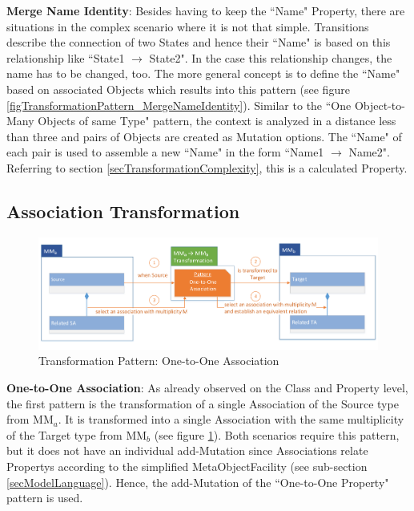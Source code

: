 \textbf{Merge Name Identity}: Besides having to keep the ``Name" \gls{Property}, there are situations in the complex scenario where it is not that simple. Transitions describe the connection of two States and hence their ``Name" is based on this relationship like ``State1 $\rightarrow$ State2". In the case this relationship changes, the name has to be changed, too. The more general concept is to define the ``Name" based on associated \glspl{Object} which results into this pattern (see figure \ref{figTransformationPattern_MergeNameIdentity}). Similar to the ``One Object-to-Many Objects of same Type" pattern, the context is analyzed in a distance less than three and pairs of \glspl{Object} are created as \gls{Mutation} options. The ``Name" of each pair is used to assemble a new ``Name" in the form ``Name1 $\rightarrow$ Name2". Referring to section \ref{secTransformationComplexity}, this is a calculated \gls{Property}.


\subsection{Association Transformation} 	
  
\begin{figure}[!ht]
	\centering
	\includegraphics[scale=0.48, trim=0cm 0cm 0cm 0cm, clip=true]{Images/TransformationPattern_OneToOneAssociation.pdf} 
	\caption{Transformation Pattern: One-to-One Association}
	\label{figTransformationPattern_OneToOneAssociation}
\end{figure}

\textbf{One-to-One Association}: As already observed on the \gls{Class} and \gls{Property} level, the first pattern is the transformation of a single \gls{Association} of the Source type from MM$_a$. It is transformed into a single \gls{Association} with the same multiplicity of the Target type from MM$_b$ (see figure \ref{figTransformationPattern_OneToOneAssociation}). Both scenarios require this pattern, but it does not have an individual add-\gls{Mutation} since \glspl{Association} relate \glspl{Property} according to the simplified \gls{MetaObjectFacility} (see sub-section \ref{secModelLanguage}). Hence, the add-\gls{Mutation} of the ``One-to-One Property" pattern is used.

